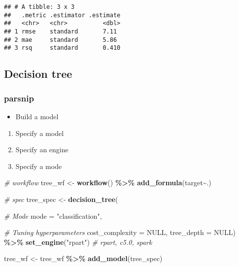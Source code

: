 \documentclass[
]{book}
\newenvironment{Shaded}{\begin{snugshade}}{\end{snugshade}}
\newcommand{\CommentTok}[1]{\textcolor[rgb]{0.56,0.35,0.01}{\textit{#1}}}
\newcommand{\DataTypeTok}[1]{\textcolor[rgb]{0.13,0.29,0.53}{#1}}
\newcommand{\KeywordTok}[1]{\textcolor[rgb]{0.13,0.29,0.53}{\textbf{#1}}}
\newcommand{\NormalTok}[1]{#1}
\newcommand{\OperatorTok}[1]{\textcolor[rgb]{0.81,0.36,0.00}{\textbf{#1}}}
\newcommand{\OtherTok}[1]{\textcolor[rgb]{0.56,0.35,0.01}{#1}}
\newcommand{\StringTok}[1]{\textcolor[rgb]{0.31,0.60,0.02}{#1}}
\providecommand{\tightlist}{%
  \setlength{\itemsep}{0pt}\setlength{\parskip}{0pt}}
\begin{document}
\begin{verbatim}
## # A tibble: 3 x 3
##   .metric .estimator .estimate
##   <chr>   <chr>          <dbl>
## 1 rmse    standard       7.11 
## 2 mae     standard       5.86 
## 3 rsq     standard       0.410
\end{verbatim}

\hypertarget{decision-tree}{%
\subsection{Decision tree}\label{decision-tree}}

\hypertarget{parsnip-1}{%
\subsubsection{parsnip}\label{parsnip-1}}

\begin{itemize}
\tightlist
\item
  Build a model
\end{itemize}

\begin{enumerate}
\def\labelenumi{\arabic{enumi}.}
\tightlist
\item
  Specify a model
\item
  Specify an engine
\item
  Specify a mode
\end{enumerate}

\begin{Shaded}
\begin{Highlighting}[]
\CommentTok{\# workflow }
\NormalTok{tree\_wf \textless{}{-}}\StringTok{ }\KeywordTok{workflow}\NormalTok{() }\OperatorTok{\%\textgreater{}\%}\StringTok{ }\KeywordTok{add\_formula}\NormalTok{(target}\OperatorTok{\textasciitilde{}}\NormalTok{.)}

\CommentTok{\# spec }
\NormalTok{tree\_spec \textless{}{-}}\StringTok{ }\KeywordTok{decision\_tree}\NormalTok{(}
  
           \CommentTok{\# Mode }
           \DataTypeTok{mode =} \StringTok{"classification"}\NormalTok{,}
           
           \CommentTok{\# Tuning hyperparameters}
           \DataTypeTok{cost\_complexity =} \OtherTok{NULL}\NormalTok{, }
           \DataTypeTok{tree\_depth =} \OtherTok{NULL}\NormalTok{) }\OperatorTok{\%\textgreater{}\%}
\StringTok{  }\KeywordTok{set\_engine}\NormalTok{(}\StringTok{"rpart"}\NormalTok{) }\CommentTok{\# rpart, c5.0, spark}

\NormalTok{tree\_wf \textless{}{-}}\StringTok{ }\NormalTok{tree\_wf }\OperatorTok{\%\textgreater{}\%}\StringTok{ }\KeywordTok{add\_model}\NormalTok{(tree\_spec)}
\end{Highlighting}
\end{Shaded}
\end{document}
